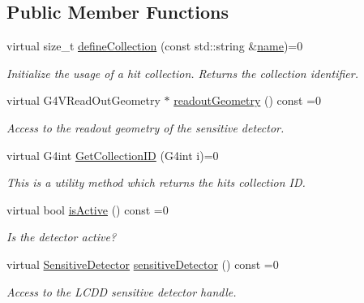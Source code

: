 \subsection*{Public Member Functions}
\begin{DoxyCompactItemize}
\item 
virtual size\+\_\+t \hyperlink{class_d_d4hep_1_1_simulation_1_1_geant4_action_s_d_acb227bd17a6f30d5df564a4d19f3f8a2}{define\+Collection} (const std\+::string \&\hyperlink{class_d_d4hep_1_1_simulation_1_1_geant4_action_af374e70b014d16afb81dd9d77cc3894b}{name})=0
\begin{DoxyCompactList}\small\item\em Initialize the usage of a hit collection. Returns the collection identifier. \end{DoxyCompactList}\item 
virtual G4\+V\+Read\+Out\+Geometry $\ast$ \hyperlink{class_d_d4hep_1_1_simulation_1_1_geant4_action_s_d_abf432e0098d25759837ddc2af5dc6c16}{readout\+Geometry} () const =0
\begin{DoxyCompactList}\small\item\em Access to the readout geometry of the sensitive detector. \end{DoxyCompactList}\item 
virtual G4int \hyperlink{class_d_d4hep_1_1_simulation_1_1_geant4_action_s_d_ac0539610b17b20d10592201b1eb0755d}{Get\+Collection\+ID} (G4int i)=0
\begin{DoxyCompactList}\small\item\em This is a utility method which returns the hits collection ID. \end{DoxyCompactList}\item 
virtual bool \hyperlink{class_d_d4hep_1_1_simulation_1_1_geant4_action_s_d_a2c3791fc610294f1d3fc9ff6fe0e755f}{is\+Active} () const =0
\begin{DoxyCompactList}\small\item\em Is the detector active? \end{DoxyCompactList}\item 
virtual \hyperlink{class_d_d4hep_1_1_simulation_1_1_geant4_action_s_d_a8a292947ea3f9b419728ef729a7e3fae}{Sensitive\+Detector} \hyperlink{class_d_d4hep_1_1_simulation_1_1_geant4_action_s_d_a8b1e15e8582895a6a7ad9ce4cf169e8e}{sensitive\+Detector} () const =0
\begin{DoxyCompactList}\small\item\em Access to the L\+C\+DD sensitive detector handle. \end{DoxyCompactList}\item 

\end{DoxyCompactItemize}

